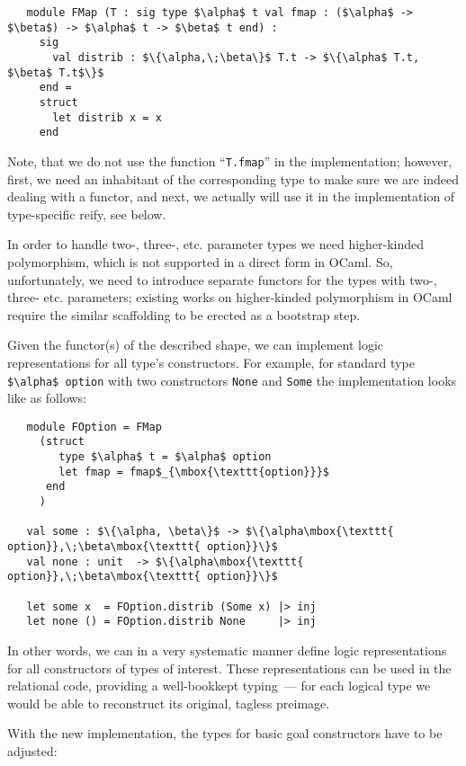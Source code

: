 \begin{lstlisting}
   module FMap (T : sig type $\alpha$ t val fmap : ($\alpha$ -> $\beta$) -> $\alpha$ t -> $\beta$ t end) :
     sig
       val distrib : $\{\alpha,\;\beta\}$ T.t -> $\{\alpha$ T.t, $\beta$ T.t$\}$
     end =
     struct
       let distrib x = x
     end
\end{lstlisting}

Note, that we do not use the function ``\lstinline{T.fmap}'' in the implementation; however, first, we need an inhabitant of the
corresponding type to make sure we are indeed dealing with a functor, and next, we actually will use it in the
implementation of type-specific reify, see below.

In order to handle two-, three-, etc. parameter types we need higher-kinded polymorphism, which is
not supported in a direct form in OCaml. So, unfortunately, we need to introduce separate
functors for the types with two-, three- etc. parameters; existing works on higher-kinded
polymorphism in OCaml~\cite{HKinded} require the similar scaffolding to be erected as a bootstrap step.

Given the functor(s) of the described shape, we can implement logic representations for
all type's constructors. For example, for standard type \lstinline{$\alpha$ option} with two constructors
\lstinline{None} and \lstinline{Some} the implementation looks like as follows:

\begin{lstlisting}
   module FOption = FMap
     (struct
        type $\alpha$ t = $\alpha$ option
        let fmap = fmap$_{\mbox{\texttt{option}}}$
      end
     )

   val some : $\{\alpha, \beta\}$ -> $\{\alpha\mbox{\texttt{ option}},\;\beta\mbox{\texttt{ option}}\}$
   val none : unit  -> $\{\alpha\mbox{\texttt{ option}},\;\beta\mbox{\texttt{ option}}\}$

   let some x  = FOption.distrib (Some x) |> inj
   let none () = FOption.distrib None     |> inj
\end{lstlisting}

In other words, we can in a very systematic manner define logic representations for all constructors
of types of interest. These representations can be used in the relational code, providing a well-bookkept
typing~--- for each logical type we would be able to reconstruct its original, tagless preimage.

With the new implementation, the types for basic goal constructors have to be adjusted:

